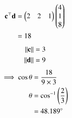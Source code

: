 \begin{enumerate}
\begin{align}
    \end{align}
    \begin{align}
        \mathbf{c}^\top\mathbf{d}&=\begin{pmatrix}2&2&1\end{pmatrix}\begin{pmatrix}4\\1\\8\end{pmatrix}\\
                           &=18
    \end{align}
    \begin{align}
        \left\lVert\mathbf{c}\right\rVert &=3\\
        \left\lVert\mathbf{d}\right\rVert &=9
    \end{align}
    \begin{align}
        \implies \cos\theta & = \frac{18}{9\times 3}\\
          \theta &= \cos^{-1}\left(\frac{2}{3}\right)\\
                 &= 48.189\degree
    \end{align}
\end{enumerate}
    